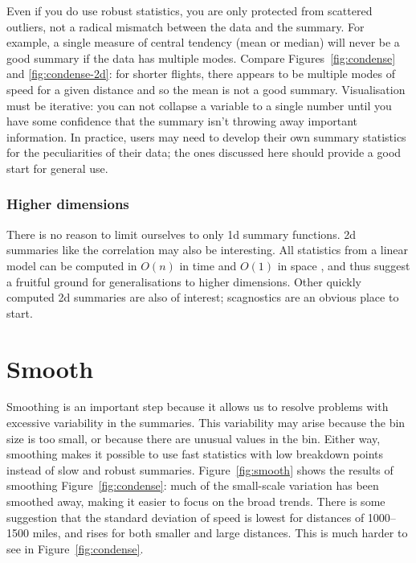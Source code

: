\documentclass[journal]{vgtc}                %
\begin{document}
Even if you do use robust statistics, you are only protected from scattered outliers, not a radical mismatch between the data and the summary. For example, a single measure of central tendency (mean or median) will never be a good summary if the data has multiple modes. Compare Figures~\ref{fig:condense} and \ref{fig:condense-2d}: for shorter flights, there appears to be multiple modes of speed for a given distance and so the mean is not a good summary. Visualisation must be iterative: you can not collapse a variable to a single number until you have some confidence that the summary isn't throwing away important information. In practice, users may need to develop their own summary statistics for the peculiarities of their data; the ones discussed here should provide a good start for general use.

\subsubsection{Higher dimensions}

There is no reason to limit ourselves to only 1d summary functions. 2d summaries like the correlation may also be interesting. All statistics from a linear model can be computed in $O(n)$ in time and $O(1)$ in space \citep{miller:1992}, and thus suggest a fruitful ground for generalisations to higher dimensions. Other quickly computed 2d summaries are also of interest; scagnostics \citep{wilkinson:2005} are an obvious place to start.

\section{Smooth}
\label{sec:smooth}

Smoothing is an important step because it allows us to resolve problems with excessive variability in the summaries. This variability may arise because the bin size is too small, or because there are unusual values in the bin. Either way, smoothing makes it possible to use fast statistics with low breakdown points instead of slow and robust summaries. Figure~\ref{fig:smooth} shows the results of smoothing Figure~\ref{fig:condense}: much of the small-scale variation has been smoothed away, making it easier to focus on the broad trends. There is some suggestion that the standard deviation of speed is lowest for distances of 1000--1500 miles, and rises for both smaller and large distances. This is much harder to see in Figure~\ref{fig:condense}.
\end{document}
